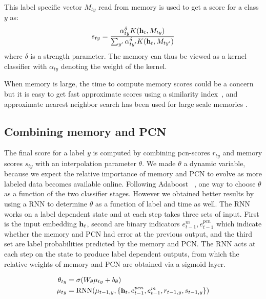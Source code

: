 \documentclass[letterpaper]{article} %
\newcommand{\vek}[1]{{\bf {#1}}}
\newcommand{\vh}{{\vek{h}}}
\newcommand{\lmm}{{s}}
\begin{document}
This label specific vector $M_{ty}$ read from memory is used to get a score for a class $y$ as:
\begin{equation}
\label{eq-mem-score}
\lmm_{ty}  = \frac{\alpha_{ty}^\delta K(\vh_t, M_{ty})} { \sum_{y'} \alpha_{ty'}^\delta K(\vh_t, M_{ty'})}
\end{equation}
where $\delta$ is a strength parameter. The memory can thus be viewed as a kernel classifier with $\alpha_{ty}$ denoting the weight of the kernel.


When memory is large, the time to compute memory scores could be a concern but it is easy to get fast approximate scores using a similarity index~\cite{Guo16,kaiser2017}, and approximate nearest neighbor search has been used for large scale memories \cite{RaeHHDSWGL16,chandarSHPGY16}.

\subsection{Combining memory and PCN}
The final score for a label $y$ is computed by combining pcn-scores $r_{ty}$ and memory scores $\lmm_{ty}$ with an interpolation parameter $\theta$.
We made $\theta$ a dynamic variable, because we expect the relative importance of memory and PCN to evolve as more labeled data becomes available online. Following Adaboost ~\cite{Schapire:1999adaboost}, one way to choose $\theta$ as a function of the two classifier stages. However we obtained better results by using a RNN to determine $\theta$ as a function of label and time as well. The RNN works on a label dependent state and at each step takes three sets of input. First is the input embedding $\vh_t$, second are binary indicators $e^m_{t-1}, e^{pcn}_{t-1}$ which indicate whether the memory and PCN had error at the previous output, and the third set are label probabilities predicted by the memory and PCN. The RNN acts at each step on the state to produce label dependent outputs, from which the relative weights of memory and PCN are obtained via a sigmoid layer.

\begin{equation}
\label{eq-comb}
\begin{split}
\theta_{ty}& = \sigma(W_\theta \mu_{ty} + b_\theta) \\
\mu_{ty} &=  \text{RNN}(\mu_{t-1,y}, \{\vh_t, e^{pcn}_{t-1},  e^m_{t-1}, r_{t-1,y}, \lmm_{t-1,y}\}) \\
\end{split}
\end{equation}
\end{document}
